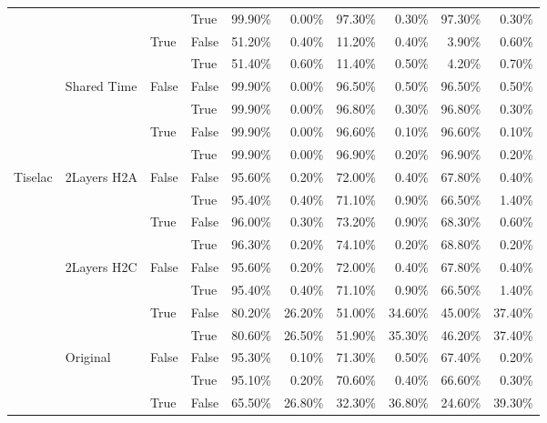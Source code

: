 \begin{tabular}{llllrrrrrr}
 &  &  & True & 99.90\% & 0.00\% & 97.30\% & 0.30\% & 97.30\% & 0.30\% \\
\cline{3-10}
 &  & \multirow[t]{2}{*}{True} & False & 51.20\% & 0.40\% & 11.20\% & 0.40\% & 3.90\% & 0.60\% \\
 &  &  & True & 51.40\% & 0.60\% & 11.40\% & 0.50\% & 4.20\% & 0.70\% \\
\cline{2-10} \cline{3-10}
 & \multirow[t]{4}{*}{Shared Time} & \multirow[t]{2}{*}{False} & False & 99.90\% & 0.00\% & 96.50\% & 0.50\% & 96.50\% & 0.50\% \\
 &  &  & True & 99.90\% & 0.00\% & 96.80\% & 0.30\% & 96.80\% & 0.30\% \\
\cline{3-10}
 &  & \multirow[t]{2}{*}{True} & False & 99.90\% & 0.00\% & 96.60\% & 0.10\% & 96.60\% & 0.10\% \\
 &  &  & True & 99.90\% & 0.00\% & 96.90\% & 0.20\% & 96.90\% & 0.20\% \\
\cline{1-10} \cline{2-10} \cline{3-10}
\multirow[t]{20}{*}{Tiselac} & \multirow[t]{4}{*}{2Layers H2A} & \multirow[t]{2}{*}{False} & False & 95.60\% & 0.20\% & 72.00\% & 0.40\% & 67.80\% & 0.40\% \\
 &  &  & True & 95.40\% & 0.40\% & 71.10\% & 0.90\% & 66.50\% & 1.40\% \\
\cline{3-10}
 &  & \multirow[t]{2}{*}{True} & False & 96.00\% & 0.30\% & 73.20\% & 0.90\% & 68.30\% & 0.60\% \\
 &  &  & True & 96.30\% & 0.20\% & 74.10\% & 0.20\% & 68.80\% & 0.20\% \\
\cline{2-10} \cline{3-10}
 & \multirow[t]{4}{*}{2Layers H2C} & \multirow[t]{2}{*}{False} & False & 95.60\% & 0.20\% & 72.00\% & 0.40\% & 67.80\% & 0.40\% \\
 &  &  & True & 95.40\% & 0.40\% & 71.10\% & 0.90\% & 66.50\% & 1.40\% \\
\cline{3-10}
 &  & \multirow[t]{2}{*}{True} & False & 80.20\% & 26.20\% & 51.00\% & 34.60\% & 45.00\% & 37.40\% \\
 &  &  & True & 80.60\% & 26.50\% & 51.90\% & 35.30\% & 46.20\% & 37.40\% \\
\cline{2-10} \cline{3-10}
 & \multirow[t]{4}{*}{Original} & \multirow[t]{2}{*}{False} & False & 95.30\% & 0.10\% & 71.30\% & 0.50\% & 67.40\% & 0.20\% \\
 &  &  & True & 95.10\% & 0.20\% & 70.60\% & 0.40\% & 66.60\% & 0.30\% \\
\cline{3-10}
 &  & \multirow[t]{2}{*}{True} & False & 65.50\% & 26.80\% & 32.30\% & 36.80\% & 24.60\% & 39.30\% \\

\end{tabular}
